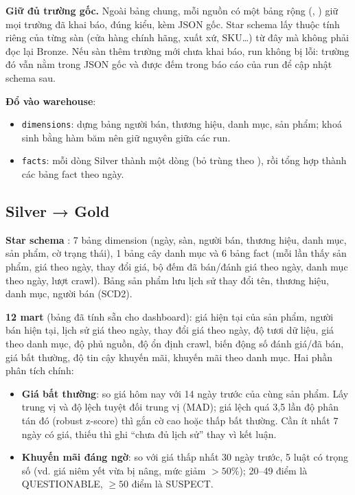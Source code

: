 \documentclass[11pt,a4paper]{article}
\begin{document}
\textbf{Giữ đủ trường gốc.} Ngoài bảng chung, mỗi nguồn có một bảng rộng (, )
giữ mọi trường đã khai báo, đúng kiểu, kèm JSON gốc. Star schema lấy thuộc tính riêng của từng sàn (cửa hàng chính hãng, xuất xứ, SKU\ldots)
từ đây mà không phải đọc lại Bronze. Nếu sàn thêm trường mới chưa khai báo, run không bị lỗi: trường đó vẫn nằm trong JSON gốc
và được đếm trong báo cáo của run để cập nhật schema sau.

\textbf{Đổ vào warehouse}:
\begin{itemize}
  \item \texttt{dimensions}: dựng bảng người bán, thương hiệu, danh mục, sản phẩm; khoá sinh bằng hàm băm nên giữ nguyên giữa các run.
  \item \texttt{facts}: mỗi dòng Silver thành một dòng  (bỏ trùng theo ),
        rồi tổng hợp thành các bảng fact theo ngày.
\end{itemize}

\subsection{Silver → Gold}
\textbf{Star schema }: 7 bảng dimension (ngày, sàn, người bán, thương hiệu, danh mục, sản phẩm, cờ trạng thái), 1 bảng cây danh mục
và 6 bảng fact (mỗi lần thấy sản phẩm, giá theo ngày, thay đổi giá, bộ đếm đã bán/đánh giá theo ngày, danh mục theo ngày, lượt crawl).
Bảng sản phẩm lưu lịch sử thay đổi tên, thương hiệu, danh mục, người bán (SCD2).


\textbf{12 mart} (bảng đã tính sẵn cho dashboard): giá hiện tại của sản phẩm, người bán hiện tại, lịch sử giá theo ngày, thay đổi giá theo ngày,
độ tươi dữ liệu, giá theo danh mục, độ phủ nguồn, độ ổn định crawl, biến động số đánh giá/đã bán, giá bất thường,
độ tin cậy khuyến mãi, khuyến mãi theo danh mục. Hai phần phân tích chính:
\begin{itemize}
  \item \textbf{Giá bất thường}: so giá hôm nay với 14 ngày trước của cùng sản phẩm. Lấy trung vị và độ lệch tuyệt đối trung vị (MAD);
        giá lệch quá 3,5 lần độ phân tán đó (robust z-score) thì gắn cờ cao hoặc thấp bất thường. Cần ít nhất 7 ngày có giá,
        thiếu thì ghi ``chưa đủ lịch sử'' thay vì kết luận.
  \item \textbf{Khuyến mãi đáng ngờ}: so với giá thấp nhất 30 ngày trước, 5 luật có trọng số (vd. giá niêm yết vừa bị nâng, mức giảm $> 50\%$);
        20--49 điểm là QUESTIONABLE, $\ge 50$ điểm là SUSPECT.
\end{itemize}
\end{document}
